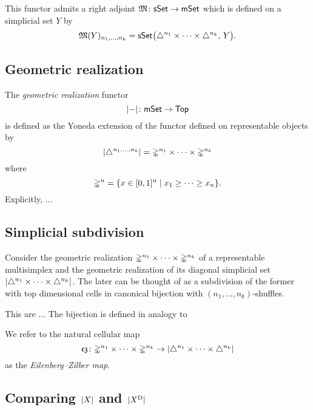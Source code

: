 This functor admits a right adjoint $\operatorname{\mathfrak{M}} \colon \mathsf{sSet} \to \mathsf{mSet}$ which is defined on a simplicial set $Y$ by
\[
\operatorname{\mathfrak{M}}(Y)_{n_1, \dots, n_k} =
\mathsf{sSet}\big( \triangle^{n_1} \times \dots \times \triangle^{n_k}, \, Y \big).
\]


\subsection{Geometric realization}

The \textit{geometric realization} functor
\[
\lvert-\rvert \colon \mathsf{mSet} \to \mathsf{Top}
\]
is defined as the Yoneda extension of the functor defined on representable objects by
\[
\lvert\triangle^{n_1, \dots, n_k}\rvert =
\mathbb{\Delta}^{n_1} \times \dots \times \mathbb{\Delta}^{n_k}
\]
where
\[
\mathbb{\Delta}^n = \{x \in [0,1]^n \mid x_1 \geq \dots \geq x_n\}.
\]
Explicitly, ... 

\subsection{Simplicial subdivision}

Consider the geometric realization $\mathbb{\Delta}^{n_1} \times \dots \times \mathbb{\Delta}^{n_k}$ of a representable multisimplex and the geometric realization of its diagonal simplicial set $\lvert\triangle^{n_1} \times \dots \times \triangle^{n_k}\rvert$.
The later can be thought of as a subdivision of the former with top dimensional cells in canonical bijection with $(n_1, \dots, n_k)$-shuffles.

This are ... 
The bijection is defined in analogy to 

We refer to the natural cellular map
\[
\operatorname{\mathfrak{ez}} \colon
\mathbb{\Delta}^{n_1} \times \dots \times \mathbb{\Delta}^{n_k} \to
\lvert\triangle^{n_1} \times \dots \times \triangle^{n_k}\rvert
\]
as the \textit{Eilenberg--Zilber map}.

\subsection{Comparing $\lvert X\rvert$ and $\lvert X^{\mathrm{D}}\rvert$}

